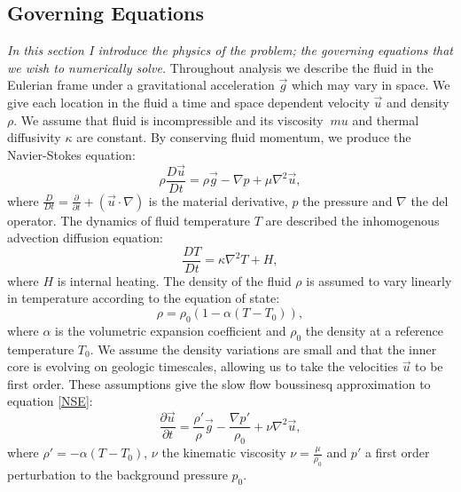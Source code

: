 \documentclass{article}
\begin{document}
\subsection*{Governing Equations}
{\it{In this section I introduce the physics of the problem; the governing equations that we wish to numerically solve.}}
\vspace{0.3cm}
\newline
\noindent Throughout analysis we describe the fluid in the Eulerian frame under a gravitational acceleration $\vec{g}$ which may vary in space. We give 
each location in the fluid a time and space dependent velocity $\vec{u}$ and density $\rho$. We assume that fluid is incompressible and its viscosity $\
mu$ and thermal diffusivity $\kappa$ are constant. By conserving fluid momentum, we produce the Navier-Stokes equation:
\begin{equation}
	\rho \frac{D \vec{u}}{D t} = \rho \vec{g} - \nabla p + \mu \nabla^2 \vec{u},
	\label{NSE}
\end{equation}
where $\frac{D}{D t} = \frac{\partial }{\partial t} + (\vec{u} \cdot \nabla)$ is the material derivative, $p$ the pressure and $\nabla$ the del 
operator. The dynamics of fluid temperature $T$ are described the inhomogenous advection diffusion equation:
\begin{equation}
	\frac{D T}{D t} = \kappa \nabla^2 T + H,
	\label{adeT}
\end{equation}
where $H$ is internal heating. The density of the fluid $\rho$ is assumed to vary linearly in temperature according to the equation of state:
\begin{equation}
	\rho = \rho_0 (1- \alpha(T - T_0)),
	\label{equation of state}
\end{equation}
where $\alpha$ is the volumetric expansion coefficient and $\rho_0$ the density at a reference temperature $T_0$. We assume the density variations are 
small and that the inner core is evolving on geologic timescales, allowing us to take the velocities $\vec{u}$ to be first order. These assumptions give 
the slow flow boussinesq approximation to equation \ref{NSE}:
\begin{equation}
	\frac{\partial \vec{u}}{\partial t} = \frac{\rho'}{\rho} \vec{g} -   \frac{\nabla p'}{\rho_0} + \nu \nabla^2 \vec{u},
	\label{NSE slow + boussinesq}
\end{equation}
where $\rho'=-\alpha(T - T_0)$, $\nu$ the kinematic viscosity $\nu = \frac{\mu}{\rho_0}$ and $p'$ a first order perturbation to the background pressure $
p_0$. 
\newline
\end{document}
